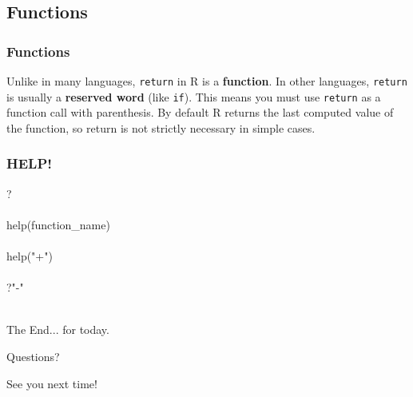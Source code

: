 \documentclass{beamer}
\begin{document}
\subsection{Functions}


\begin{frame}
	\frametitle{Functions}
	\lstV
	Unlike in many languages, \texttt{return} in R is a \textbf{function}.
	In other languages, \texttt{return} is usually a \textbf{reserved word} 
	(like \texttt{if}). This means you must use \texttt{return} as a function 
	call with parenthesis. By default R returns the last computed value of the 
	function, so return is not strictly necessary in simple cases.
\end{frame}


\begin{frame}
	\frametitle{HELP!}
	\begin{center}
			? \\~\\
			help(function\_name) \\~\\
			help("+") \\~\\
			?"-" \\~\\
	\end{center}
\end{frame}


\begin{frame}
\Huge{\centerline{The End... for today.}}
\Huge{\centerline{Questions?}}
\Huge{\centerline{See you next time!}}
\end{frame}

\end{document}
